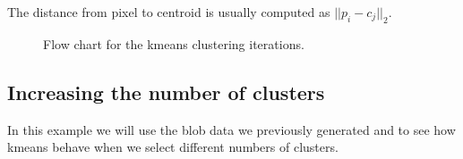 \documentclass[letterpaper,10pt,english]{sphinxmanual}
\begin{document}
\sphinxAtStartPar
The distance from pixel  to centroid  is usually computed as \(||p_i - c_j||_2\).

\begin{figure}[htbp]
\centering
\capstart

\noindent{}
\caption{Flow chart for the k\sphinxhyphen{}means clustering iterations.}\label{\detokenize{05-AdvancedSegmentation:id4}}\end{figure}


\subsection{Increasing the number of clusters}
\label{\detokenize{05-AdvancedSegmentation:increasing-the-number-of-clusters}}
\sphinxAtStartPar
In this example we will use the blob data we previously generated and to see how k\sphinxhyphen{}means behave when we select different numbers of clusters.

\begin{sphinxVerbatim}[commandchars=\\\{\}]
   

    
          
    \PYG{p}{[}\PYG{p}{]}  
    \PYG{p}{[}\PYG{p}{]}
\end{sphinxVerbatim}
\end{document}
